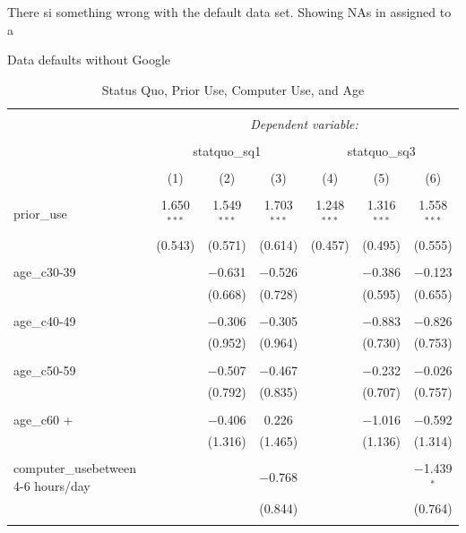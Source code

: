 \documentclass[
  11pt,
]{article}
\begin{document}
There si something wrong with the default data set. Showing NAs in assigned to a

Data defaults without Google

\begin{table} \centering 
  \caption{Status Quo, Prior Use, Computer Use, and Age} 
  \label{tab:sq} 
\small 
\begin{tabular}{@{\extracolsep{3pt}}lcccccc} 
\\[-1.8ex]\hline 
\hline \\[-1.8ex] 
 & \multicolumn{6}{c}{\textit{Dependent variable:}} \\ 
\cline{2-7} 
\\[-1.8ex] & \multicolumn{3}{c}{statquo\_sq1} & \multicolumn{3}{c}{statquo\_sq3} \\ 
\\[-1.8ex] & (1) & (2) & (3) & (4) & (5) & (6)\\ 
\hline \\[-1.8ex] 
 prior\_use & 1.650$^{***}$ & 1.549$^{***}$ & 1.703$^{***}$ & 1.248$^{***}$ & 1.316$^{***}$ & 1.558$^{***}$ \\ 
  & (0.543) & (0.571) & (0.614) & (0.457) & (0.495) & (0.555) \\ 
  & & & & & & \\ 
 age\_c30-39 &  & $-$0.631 & $-$0.526 &  & $-$0.386 & $-$0.123 \\ 
  &  & (0.668) & (0.728) &  & (0.595) & (0.655) \\ 
  & & & & & & \\ 
 age\_c40-49 &  & $-$0.306 & $-$0.305 &  & $-$0.883 & $-$0.826 \\ 
  &  & (0.952) & (0.964) &  & (0.730) & (0.753) \\ 
  & & & & & & \\ 
 age\_c50-59 &  & $-$0.507 & $-$0.467 &  & $-$0.232 & $-$0.026 \\ 
  &  & (0.792) & (0.835) &  & (0.707) & (0.757) \\ 
  & & & & & & \\ 
 age\_c60 + &  & $-$0.406 & 0.226 &  & $-$1.016 & $-$0.592 \\ 
  &  & (1.316) & (1.465) &  & (1.136) & (1.314) \\ 
  & & & & & & \\ 
 computer\_usebetween 4-6 hours/day &  &  & $-$0.768 &  &  & $-$1.439$^{*}$ \\ 
  &  &  & (0.844) &  &  & (0.764) \\ 
  & & & & & & \\ 

\end{tabular}
\end{table}
\end{document}
